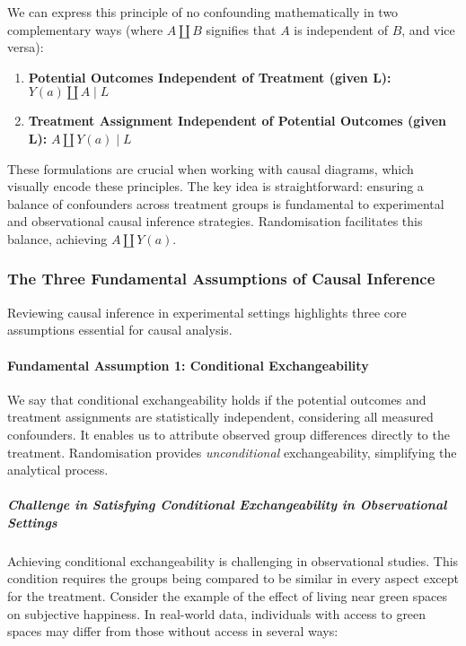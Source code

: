 \documentclass[
  singlecolumn]{article}
\let\oldparagraph\paragraph
\renewcommand{\paragraph}[1]{\oldparagraph{#1}\mbox{}}
\let\oldsubparagraph\subparagraph
\renewcommand{\subparagraph}[1]{\oldsubparagraph{#1}\mbox{}}
\providecommand{\tightlist}{%
  \setlength{\itemsep}{0pt}\setlength{\parskip}{0pt}}\usepackage{longtable,booktabs,array}
\begin{document}
We can express this principle of no confounding mathematically in two
complementary ways (where \(A \coprod B\) signifies that \(A\) is
independent of \(B\), and vice versa):

\begin{enumerate}
\def\labelenumi{\arabic{enumi}.}
\tightlist
\item
  \textbf{Potential Outcomes Independent of Treatment (given L):}
  \(Y(a) \coprod A \mid L\)
\item
  \textbf{Treatment Assignment Independent of Potential Outcomes (given
  L):} \(A \coprod Y(a) \mid L\)
\end{enumerate}

These formulations are crucial when working with causal diagrams, which
visually encode these principles. The key idea is straightforward:
ensuring a balance of confounders across treatment groups is fundamental
to experimental and observational causal inference strategies.
Randomisation facilitates this balance, achieving \(A \coprod Y(a)\).

\subsubsection{The Three Fundamental Assumptions of Causal
Inference}\label{sec-three-fundamental-assumptions}

Reviewing causal inference in experimental settings highlights three
core assumptions essential for causal analysis.

\paragraph{Fundamental Assumption 1: Conditional
Exchangeability}\label{fundamental-assumption-1-conditional-exchangeability}

We say that conditional exchangeability holds if the potential outcomes
and treatment assignments are statistically independent, considering all
measured confounders. It enables us to attribute observed group
differences directly to the treatment. Randomisation provides
\emph{unconditional} exchangeability, simplifying the analytical
process.

\subparagraph{Challenge in Satisfying Conditional Exchangeability in
Observational
Settings}\label{challenge-in-satisfying-conditional-exchangeability-in-observational-settings}

Achieving conditional exchangeability is challenging in observational
studies. This condition requires the groups being compared to be similar
in every aspect except for the treatment. Consider the example of the
effect of living near green spaces on subjective happiness. In
real-world data, individuals with access to green spaces may differ from
those without access in several ways:
\end{document}
